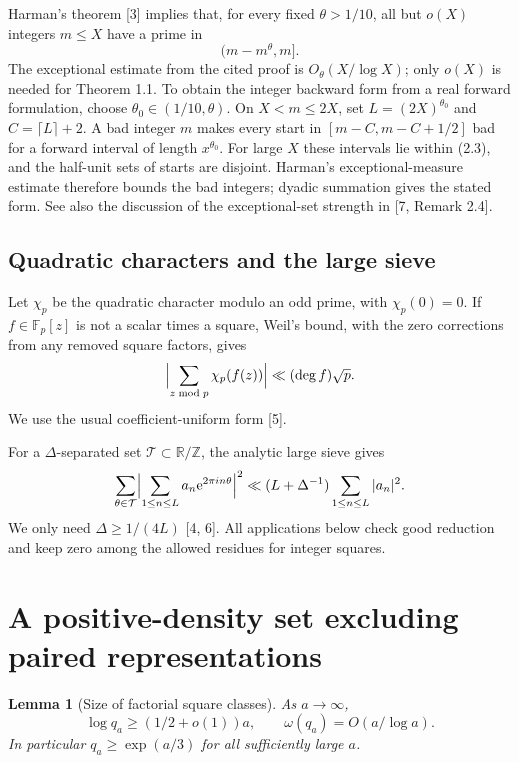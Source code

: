 \documentclass[letterpaper]{article}
\newtheorem{lemma}[theorem]{Lemma}
\theoremstyle{definition}
\theoremstyle{remark}
\numberwithin{equation}{section}
\begin{document}
Harman's theorem [3] implies that, for every fixed $\theta>1/10$, all but $o(X)$ integers $m\le X$ have
a prime in
\begin{equation}
  (m-m^\theta,m].
\end{equation}
The exceptional estimate from the cited proof is $O_\theta(X/\log X)$; only $o(X)$ is needed for
Theorem 1.1. To obtain the integer backward form from a real forward formulation, choose
$\theta_0\in(1/10,\theta)$. On $X<m\le 2X$, set $L=(2X)^{\theta_0}$ and $C=\lceil L\rceil+2$. A bad integer $m$ makes every
start in $[m-C,m-C+1/2]$ bad for a forward interval of length $x^{\theta_0}$. For large $X$ these intervals
lie within (2.3), and the half-unit sets of starts are disjoint. Harman's exceptional-measure
estimate therefore bounds the bad integers; dyadic summation gives the stated form. See also
the discussion of the exceptional-set strength in [7, Remark 2.4].

\subsection{Quadratic characters and the large sieve}

Let $\chi_p$ be the quadratic character modulo an odd prime, with $\chi_p(0)=0$. If $f\in\mathbb F_p[z]$ is not a
scalar times a square, Weil's bound, with the zero corrections from any removed square factors,
gives
\begin{equation}
  \Bigl|\sum_{z \bmod p}\chi_p(f(z))\Bigr|\ll(\deg f)\sqrt p.
\end{equation}
We use the usual coefficient-uniform form [5].

For a $\Delta$-separated set $\mathcal T\subset\mathbb R/\mathbb Z$, the analytic large sieve gives
\begin{equation}
  \sum_{\theta\in\mathcal T}\Bigl|\sum_{1\le n\le L}a_n\mathrm e^{2\pi in\theta}\Bigr|^2
  \ll(L+\Delta^{-1})\sum_{1\le n\le L}|a_n|^2.
\end{equation}
We only need $\Delta\ge 1/(4L)$ [4, 6]. All applications below check good reduction and keep zero
among the allowed residues for integer squares.

\section{A positive-density set excluding paired representations}

\begin{lemma}[Size of factorial square classes]
As $a\to\infty$,
\[
  \log q_a\ge(1/2+o(1))a,\qquad \omega(q_a)=O(a/\log a).
\]
In particular $q_a\ge\exp(a/3)$ for all sufficiently large $a$.
\end{lemma}
\end{document}
